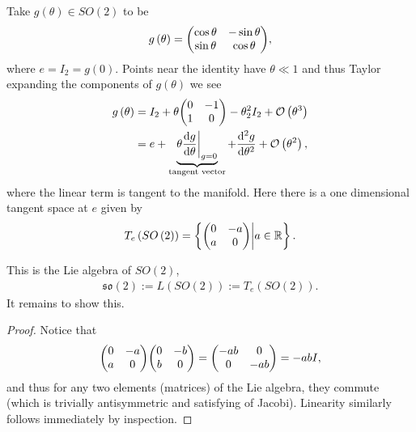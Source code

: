 Take $ g\left( \theta \right) \in SO \left( 2 \right) $ to be
\begin{align}
    g\left( \theta \right) = \mqty( \cos \theta & - \sin \theta \\ \sin \theta & \cos \theta)
,\end{align}
where $e = I_2 = g\left( 0 \right) $. Points near the identity have $\theta \ll 1$ and thus Taylor expanding the components of $g\left( \theta \right) $ we see
\begin{align}
    g \left( \theta \right) &= I_2 + \theta \mqty ( 0 & -1 \\ 1 & 0 ) - \theta^2_2 I_2 + \mathcal{O}\left( \theta^3 \right) \\
                            &= e + \underbrace{\theta \dv{g}{\theta} \bigg|_{g = 0}}_{\text{tangent vector}} + \dv[2]{g}{\theta} + \mathcal{O}\left( \theta^2 \right)
,\end{align}
where the linear term is tangent to the manifold. Here there is a one dimensional tangent space at $e$ given by
\begin{align}
    T_e \left( SO \left( 2 \right)  \right) = \left\{ \mqty( 0 & -a \\ a & 0 ) \bigg| a \in \R \right\} 
.\end{align}

This is the Lie algebra of $SO \left( 2 \right) $,
\begin{align}
    \mathfrak{so}\left( 2 \right) :=  L \left( SO \left( 2 \right)  \right) := T_e \left( SO \left( 2 \right)  \right) 
.\end{align}
It remains to show this.
\begin{proof}
    Notice that
    \begin{align}
        \mqty( 0 & -a \\ a & 0 ) \mqty( 0 & -b \\ b & 0) = \mqty( -ab & 0 \\ 0 & -ab) = -ab I
    ,\end{align}
    and thus for any two elements (matrices) of the Lie algebra, they commute (which is trivially antisymmetric and satisfying of Jacobi). Linearity similarly follows immediately by inspection.
\end{proof}

